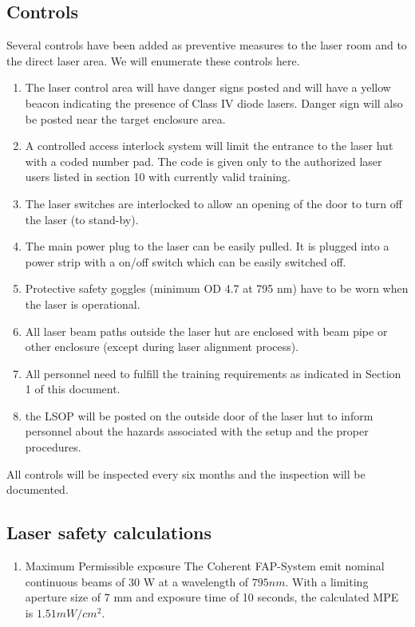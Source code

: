 {\subsection{Controls}

Several controls have been added as preventive measures to the laser room 
and to the direct laser area. We will enumerate these controls here.
\begin {enumerate}
\item The laser control area will have danger signs posted and will have a
yellow beacon indicating the presence of Class IV diode lasers. Danger
sign will also be posted near the target enclosure area.
\item A controlled access interlock system will limit the entrance to
the laser hut with a coded number pad. The code is given only to the
authorized laser users listed in section 10 with currently valid
training.
\item The laser switches are interlocked to allow an opening of the
door to turn off the laser (to stand-by).
\item The main power plug to the laser can be easily pulled. It is
plugged into a power strip with a on/off switch which can be easily
switched off.
\item Protective safety goggles (minimum OD 4.7 at 795 nm) have to be
worn when the laser is operational.
\item All laser beam paths outside the laser hut are enclosed with
beam pipe or other enclosure (except during laser alignment process).
\item All personnel need to fulfill the training requirements as
indicated in Section 1 of this document.
\item the LSOP will be posted on the outside door of the laser hut to
inform personnel about the hazards associated with the setup and the
proper procedures.
\end {enumerate}

All controls will be inspected every six months
and the inspection will be documented.

\subsection{Laser safety calculations}

\begin {enumerate}
\item {Maximum Permissible exposure}
The Coherent FAP-System
 emit nominal 
continuous beams of 30 W at a wavelength of $795 nm$.
With a limiting aperture size of 7 mm and exposure time of 10 seconds,
the calculated MPE is $1.51 mW/cm^2$.


\end{enumerate}}
